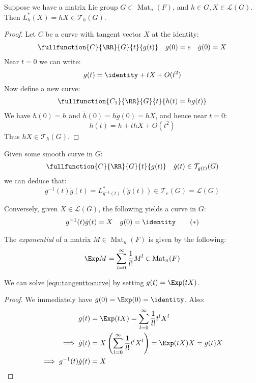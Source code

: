 \documentclass{jknotes}
\begin{document}
\begin{lemma}
    Suppose we have a matrix Lie group \(G \subset \operatorname{Mat}_n(F)\), and \(h\in G, X \in \mathcal{L}(G)\). Then \(L_h^*(X) = hX \in \mathcal{T}_h(G)\).
\end{lemma}
\begin{proof}
    Let \(C\) be a curve with tangent vector \(X\) at the identity:
    \begin{align}
        \fullfunction{C}{\RR}{G}{t}{g(t)} && g(0)=e && \dot{g}(0) = X
    \end{align}
    Near \(t=0\) we can write:
    \begin{equation}
        g(t)=\identity+tX+O(t^2)
    \end{equation}
    Now define a new curve:
    \begin{align}
        \fullfunction{C_1}{\RR}{G}{t}{h(t)=hg(t)}
    \end{align}
    We have \(h(0)=h\) and \(\dot{h}(0)=h\dot{g}(0)=hX\), and hence near \(t=0\):
    \begin{equation}
        h(t) = h + thX + O(t^2)
    \end{equation}
    Thus \(hX \in \mathcal{T}_h(G)\).
\end{proof}
\begin{cor}
    Given some smooth curve in \(G\):
    \begin{align}
        \fullfunction{C}{\RR}{G}{t}{g(t)} && \dot{g}(t) \in \mathcal{T}_{g(t)}(G)
    \end{align}
    we can deduce that:
    \begin{equation}
        g^{-1}(t)\dot{g}(t) = L_{g^{-1}(t)}^*(\dot{g}(t)) \in \mathcal{T}_e(G) = \mathcal{L}(G)
    \end{equation}
\end{cor}
Conversely, given \(X \in \mathcal{L}(G)\), the following yields a curve in \(G\):
\begin{align}
    g^{-1}(t)\dot{g}(t) = X && g(0) = \identity \tag{\(*\)}
    \label{eqn:tangenttocurve}
\end{align}
\begin{defn}
    The \emph{exponential} of a matrix \(M\in \operatorname{Mat}_n(F)\) is given by the following:
    \begin{equation}
        \Exp M = \sum_{l=0}^\infty \frac{1}{l!}M^l \in \operatorname{Mat}_n(F)
    \end{equation}
\end{defn}

We can solve \eqref{eqn:tangenttocurve} by setting \(g(t)=\Exp(tX)\).
\begin{proof}
    We immediately have \(g(0)=\Exp(0)=\identity\). Also:
    \begin{align}
        g(t) &= \Exp(tX) = \sum_{l=0}^\infty\frac{1}{l!}t^lX^l\\
        \implies \dot{g}(t) &= X \left( \sum_{l=0}^\infty\frac{1}{l!}t^lX^l \right) = \Exp(tX)X = g(t)X\\
        \implies g^{-1}(t)\dot{g}(t)&=X
    \end{align}
\end{proof}
\end{document}
